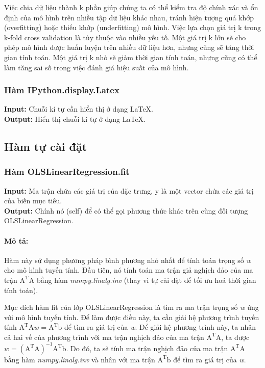 \documentclass[]{article}
\begin{document}
Việc chia dữ liệu thành k phần giúp chúng ta có thể kiểm tra độ chính xác và ổn định của mô hình trên nhiều tập dữ liệu khác nhau, tránh hiện tượng quá khớp (overfitting) hoặc thiếu khớp (underfitting) mô hình. Việc lựa chọn giá trị k trong k-fold cross validation là tùy thuộc vào nhiều yếu tố. Một giá trị k lớn sẽ cho phép mô hình được huấn luyện trên nhiều dữ liệu hơn, nhưng cũng sẽ tăng thời gian tính toán. Một giá trị k nhỏ sẽ giảm thời gian tính toán, nhưng cũng có thể làm tăng sai số trong việc đánh giá hiệu suất của mô hình. \cite{stackexchangeChoiceKfold}

\subsubsection{Hàm IPython.display.Latex}
\noindent
\textbf{Input:} Chuỗi kí tự cần hiển thị ở dạng \LaTeX. \\
\textbf{Output:} Hiển thị chuỗi kí tự ở dạng \LaTeX.

\subsection{Hàm tự cài đặt}
\subsubsection{Hàm OLSLinearRegression.fit} \label{fit}
\noindent
\textbf{Input:} Ma trận chứa các giá trị của đặc trưng, y là một vector chứa các giá trị của biến mục tiêu. \\
\textbf{Output:} Chính nó (self) để có thể gọi phương thức khác trên cùng đối tượng OLSLinearRegression.
\paragraph{Mô tả:}

Hàm này sử dụng phương pháp bình phương nhỏ nhất để tính toán trọng số \textit{w} cho mô hình tuyến tính. Đầu tiên, nó tính toán ma trận giả nghịch đảo của ma trận $\text{A}^\text{T} \text{A}$ bằng hàm \textit{numpy.linalg.inv} (thay vì tự cài đặt để tối ưu hoá thời gian tính toán). 

Mục đích hàm fit của lớp OLSLinearRegression là tìm ra ma trận trọng số \textit{w} ứng với mô hình tuyến tính. Để làm được điều này, ta cần giải hệ phương trình tuyến tính $\text{A}^\text{T} \text{A} \textit{w} = \text{A}^\text{T} \text{b}$ để tìm ra giá trị của \textit{w}. Để giải hệ phương trình này, ta nhân cả hai vế của phương trình với ma trận nghịch đảo của ma trận $\text{A}^\text{T} \text{A}$, ta được $\textit{w} = (\text{A}^\text{T} \text{A})^{-1} \text{A}^\text{T} \text{b}$. Do đó, ta sẽ tính ma trận nghịch đảo của ma trận $\text{A}^\text{T} \text{A}$ bằng hàm \textit{numpy.linalg.inv} và nhân với ma trận $\text{A}^\text{T} \text{b}$ để tìm ra giá trị của \textit{w}.
\end{document}
